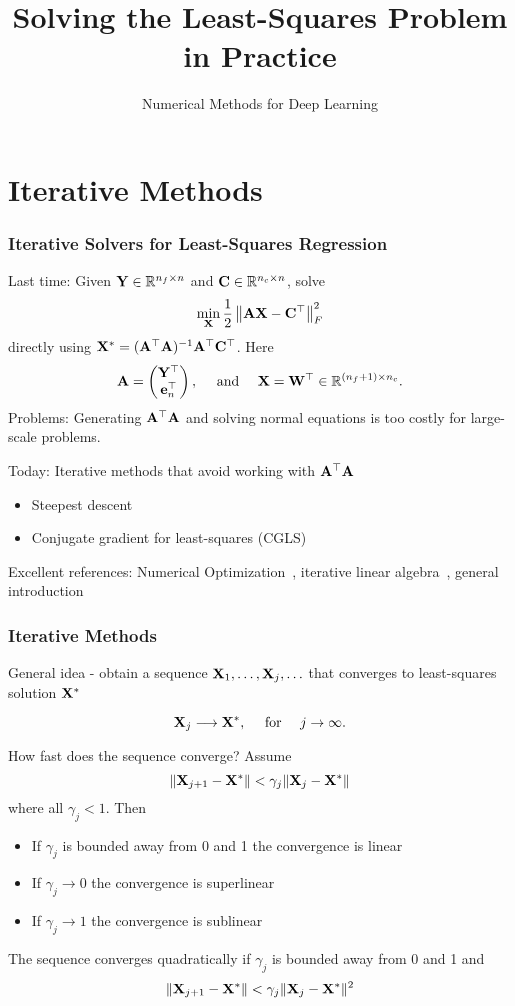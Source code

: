 \documentclass[12pt,fleqn]{beamer}
\title[Iterative LS]{Solving the Least-Squares Problem in Practice}
\subtitle{Numerical Methods for Deep Learning}
\date{}
\begin{document}
\makebeamertitle


\section{Iterative Methods} %
\label{sec:iterative_methods}
\begin{frame}\frametitle{Iterative Solvers for Least-Squares Regression}
	Last time: Given ${\bf Y}\in \mathbb{R}^{n_f\times n}$ and ${\bf C}\in\mathbb{R}^{n_c\times n}$, solve
	$$
	\min_{{\bf X}}  \frac12\left\|  {\bf A}   {\bf X}  -  {\bf C}^\top \right\|_F^2
	$$
	directly using ${\bf X}^* = ({\bf A}^{\top} {\bf A})^{-1}{\bf A}^{\top} {\bf C}^\top$. Here
	$$
		{\bf A} = \begin{pmatrix}
			{\bf Y}^\top \\ {\bf e}_n^\top
		\end{pmatrix}, \quad \text{ and } \quad 
		{\bf X} = {\bf W}^\top \in \mathbb{R}^{(n_f+1)\times n_c}.
	$$
	Problems: Generating  ${\bf A}^{\top}{\bf A}$ and solving normal equations is too costly for large-scale problems.
	
	\pause

	\bigskip
	
Today: Iterative methods that avoid working with ${\bf A}^{\top}{\bf A}$ 
\begin{itemize}
\item Steepest descent 
\item Conjugate gradient for least-squares (CGLS)
\end{itemize}
Excellent references: Numerical Optimization~\cite{NocedalWright2006}, iterative linear algebra~\cite{Saad2003}, general introduction \cite{AscherGreif2011}
\end{frame}

\begin{frame}\frametitle{Iterative Methods}


General idea - obtain a sequence ${\bf X}_1, \ldots,{\bf X}_j,\ldots$
that converges to least-squares solution ${\bf X}^*$

$$
	{\bf X}_j \longrightarrow {\bf X}^*, \quad \text{ for } \quad j \to \infty.
$$

\bigskip

How fast does the sequence converge? Assume
$$
\|{\bf X}_{j+1} - {\bf X}^* \| < \gamma_j \|{\bf X}_{j} - {\bf X}^* \|
$$ 
where all $\gamma_j < 1$. Then

\begin{itemize}
\item If $\gamma_j$ is bounded away from $0$ and 1 the convergence is linear
\item If $\gamma_j \rightarrow 0$ the convergence is superlinear
\item If $\gamma_j \rightarrow 1$ the convergence is sublinear
\end{itemize}

The sequence converges quadratically if $\gamma_j$ is bounded away from 0 and 1 and 
$$ \|{\bf X}_{j+1} - {\bf X}^* \| < \gamma_j \|{\bf X}_{j} - {\bf X}^* \|^2 $$ 
\end{frame}
\end{document}
